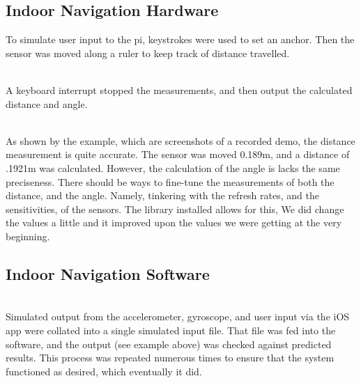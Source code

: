 \documentclass[letterpaper,12pt]{article}
\begin{document}
\subsection{Indoor Navigation Hardware}
To simulate user input to the pi, keystrokes were used to set an anchor. Then the sensor was moved along a ruler to keep track of distance travelled.\par
{}\\
 A keyboard interrupt stopped the measurements, and then output the calculated distance and angle.\par
{}\\
As shown by the example, which are screenshots of a recorded demo, the distance measurement is quite accurate. The sensor was moved 0.189m, and a distance of .1921m was calculated. However, the calculation of the angle is lacks the same preciseness. There should be ways to fine-tune the measurements of both the distance, and the angle. Namely, tinkering with the refresh rates, and the sensitivities, of the sensors. The library installed allows for this, We did change the values a little and it improved upon the values we were getting at the very beginning.
\newpage
\subsection{Indoor Navigation Software}
 \\

Simulated output from the accelerometer, gyroscope, and user input via the iOS app were collated into a single simulated input file. That file was fed into the software, and the output (see example above) was checked against predicted results. This process was repeated numerous times to ensure that the system functioned as desired, which eventually it did.
\end{document}
